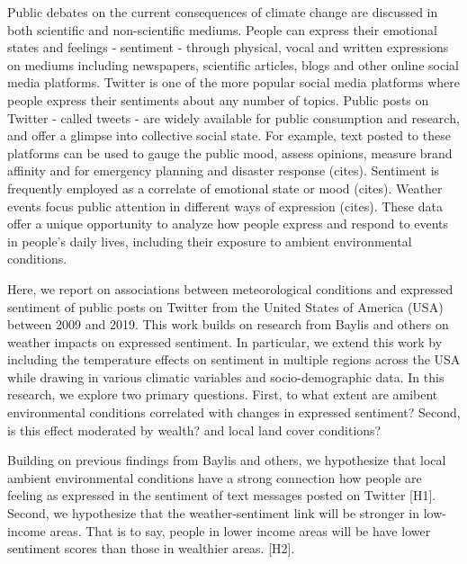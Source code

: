 \documentclass{article}
\begin{document}
Public debates on the current consequences of climate change are discussed in both scientific and non-scientific mediums. 
People can express their emotional states and feelings - sentiment - through physical, vocal and written expressions on mediums including newspapers, scientific articles, blogs and other online social media platforms. Twitter is one of the more popular social media platforms where people express their sentiments about any number of topics. Public posts on Twitter - called tweets - are widely available for public consumption and research, and offer a glimpse into collective social state. For example, text posted to these platforms can be used to gauge the public mood, assess opinions, measure brand affinity and for emergency planning and disaster response (cites). 
Sentiment is frequently employed as a correlate of emotional state or mood (cites). Weather events focus public attention in different ways of expression (cites). These data offer a unique opportunity to analyze how people express and respond to events in people's daily lives, including their exposure to ambient environmental conditions.



Here, we report on associations between meteorological conditions and expressed sentiment of public posts on Twitter from the United States of America (USA) between 2009 and 2019. This work builds on research from Baylis and others \cite{baylis_weather_2018} on weather impacts on expressed sentiment. In particular, we extend this work by including the temperature effects on sentiment in multiple regions across the USA while drawing in various climatic variables and socio-demographic data. In this research, we explore two primary questions. First, to what extent are amibent environmental conditions correlated with changes in expressed sentiment? Second, is this effect moderated by wealth? and local land cover conditions?

Building on previous findings from Baylis and others, we hypothesize that local ambient environmental conditions have a strong connection how people are feeling as expressed in the sentiment of text messages posted on Twitter [H1]. Second, we hypothesize that the weather-sentiment link will be stronger in low-income areas. That is to say, people in lower income areas will be have lower sentiment scores than those in wealthier areas. [H2].
\end{document}
